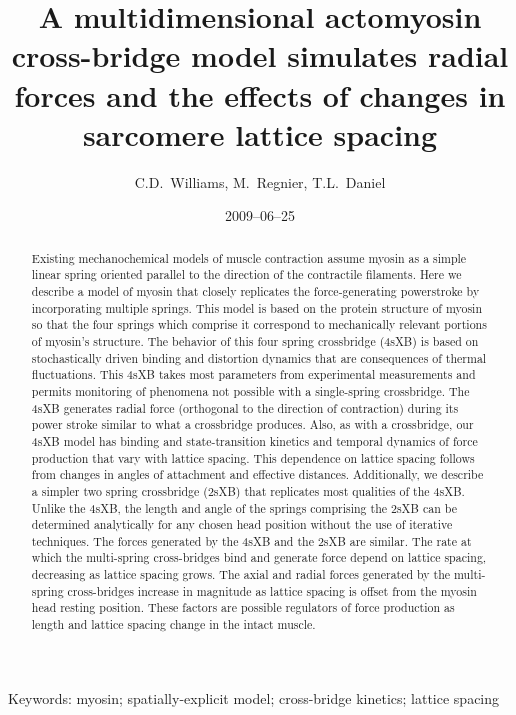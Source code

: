 \documentclass[]{article}
\title{A multidimensional actomyosin cross-bridge model simulates radial forces and the effects of changes in sarcomere lattice spacing}
\author{C.D.\ Williams, M.\ Regnier, T.L.\ Daniel}
\date{2009--06--25}
\begin{document}
\maketitle{}

\begin{abstract} 
Existing mechanochemical models of muscle contraction assume myosin as a simple linear spring oriented parallel to the direction of the contractile filaments.
Here we describe a model of myosin that closely replicates the force-generating powerstroke by incorporating multiple springs.
This model is based on the protein structure of myosin so that the four springs which comprise it correspond to mechanically relevant portions of myosin's structure.
The behavior of this four spring crossbridge (4sXB) is based on stochastically driven binding and distortion dynamics that are consequences of thermal fluctuations. 
This 4sXB takes most parameters from experimental measurements and permits monitoring of phenomena not possible with a single-spring crossbridge.
The 4sXB generates radial force (orthogonal to the direction of contraction) during its power stroke similar to what a crossbridge produces.
Also, as with a crossbridge, our 4sXB model has binding and state-transition kinetics  and temporal dynamics of force production that vary with lattice spacing. 
 This dependence on lattice spacing follows from changes in angles of attachment  and effective distances. 
Additionally, we describe a simpler two spring crossbridge (2sXB) that replicates most qualities of the 4sXB.
Unlike the 4sXB, the length and angle of the springs comprising the 2sXB can be determined analytically for any chosen head position without the use of iterative techniques.
The forces generated by the 4sXB and the 2sXB are similar.
The rate at which the multi-spring cross-bridges bind and generate force depend on lattice spacing, decreasing as lattice spacing grows. 
The axial and radial forces generated by the multi-spring cross-bridges increase in magnitude as lattice spacing is offset from the myosin head resting position. 
These factors are possible regulators of force production as length and lattice spacing change in the intact muscle.
\end{abstract}

Keywords: myosin; spatially-explicit model; cross-bridge kinetics; lattice spacing

\end{document}
